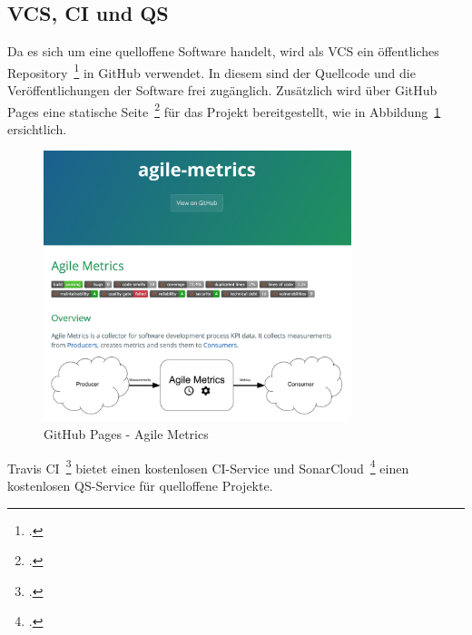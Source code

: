 \subsection{\ac{VCS}, \ac{CI} und \ac{QS}}

Da es sich um eine quelloffene Software handelt, wird als \ac{VCS} ein öffentliches Repository~\footcite{agile_metrics_repo} in GitHub verwendet.
In diesem sind der Quellcode und die Veröffentlichungen der Software frei zugänglich.
Zusätzlich wird über GitHub Pages eine statische Seite~\footcite{agile_metrics_page} für das Projekt bereitgestellt, wie in Abbildung~\ref{fig:github_pages} ersichtlich.

\begin{savenotes}
    \begin{figure}[H] 
        \centering
            \includegraphics[width=0.8\textwidth]{img/github-pages.png}
        \caption{GitHub Pages {-} Agile Metrics}\label{fig:github_pages}
    \end{figure}
\end{savenotes}

Travis CI~\footcite{travis_agile_metrics} bietet einen kostenlosen \ac{CI}-Service und SonarCloud~\footcite{sonarcloud_agile_metrics} einen kostenlosen \ac{QS}-Service für quelloffene Projekte.

